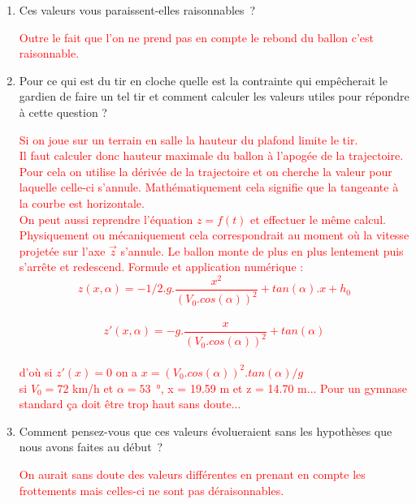 \documentclass[french,a4paper,10pt]{article}
\begin{document}
\begin{enumerate}
    \item Ces valeurs vous paraissent-elles raisonnables ?\\
\begin{reponse}
\textcolor{red}{Outre le fait que l’on ne prend pas en compte le rebond du ballon c’est raisonnable.}
\end{reponse}

    \item Pour ce qui est du tir \og en cloche \fg{} quelle est la contrainte qui empêcherait le gardien de faire un tel tir et comment calculer les valeurs utiles pour répondre à cette question ?
\begin{reponse}
    \textcolor{red}{Si on joue sur un terrain en salle la hauteur du plafond limite le tir.\\
Il faut calculer donc hauteur maximale du ballon à l'apogée de la trajectoire. Pour cela on utilise la dérivée de la trajectoire et on cherche la valeur pour laquelle celle-ci s'annule. Mathématiquement cela signifie que la tangeante à la courbe est horizontale.\\
On peut aussi reprendre l'équation $z = f(t)$ et effectuer le même calcul. Physiquement ou mécaniquement cela correspondrait au moment où la vitesse projetée sur l'axe $\vec{z}$ s'annule. Le ballon monte de plus en plus lentement puis \og s'arrête \fg{} et redescend.
Formule et application numérique :\\
$$z(x,\alpha) = - 1/2 . g . \frac{x^2}{(V_{0}. cos(\alpha))^2} + tan(\alpha) . x + h_0$$\\
$$z'(x,\alpha) = - g . \frac{x}{(V_{0}. cos(\alpha))^2} + tan(\alpha)$$\\
d'où si $z'(x) = 0$ on a $x = (V_0 . cos(\alpha))^2 . tan(\alpha) / g$\\
si $V_0 = 72$ km/h et $\alpha = 53$~°, x = 19.59 m et z = 14.70 m... Pour un gymnase standard ça doit être trop haut sans doute...}
\end{reponse}

    \item Comment pensez-vous que ces valeurs évolueraient sans les hypothèses que nous avons faites au début ?\\
\begin{reponse}
\textcolor{red}{On aurait sans doute des valeurs différentes en prenant en compte les frottements mais celles-ci ne sont pas déraisonnables.}
\end{reponse}

\end{enumerate}
\end{document}
